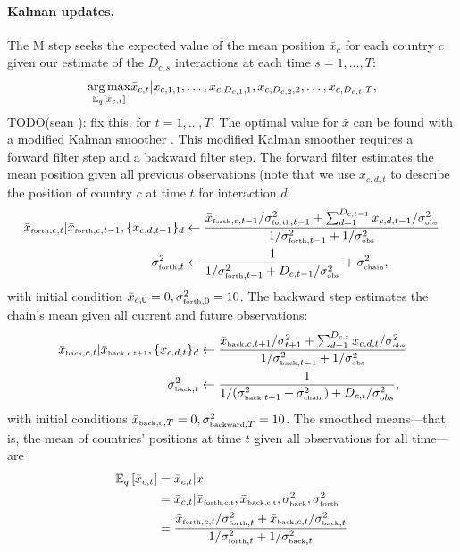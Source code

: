 \paragraph{Kalman updates.}
The M step seeks the expected value of the mean position $\bar x_c$
for each country $c$ given our estimate of the $D_{c,s}$ interactions
at each time $s=1, \ldots, T$:
\begin{align}
  \underset{ \mathbb{E}_q\left[ \bar x_{c,t} \right] }
  {\arg \max } \bar x_{c,t} | x_{c,1,1}, \ldots, x_{c,D_{c,1},1}, x_{c,D_{c,2},2},
  \ldots, x_{c,D_{c,t},T},
\end{align}
TODO(sean ): fix this.
for $t=1, \ldots, T$. The optimal value for $\bar x$ can be found with
a modified Kalman smoother \cite{kalman:1960}.  This modified Kalman
smoother requires a forward filter step and a backward filter step.
The forward filter estimates the mean position given all previous
observations (note that we use $x_{c,d,t}$ to describe the position of
country $c$ at time $t$ for interaction $d$:
\begin{align}
  \bar x_{\mbox{\tiny forth},c,t} | \bar x_{\mbox{\tiny forth},c,t-1}, \{ x_{c,d,t-1} \}_{d}
  & \gets \frac{\bar x_{\mbox{\tiny forth},c,t-1} / \sigma_{\mbox{\tiny forth},t-1}^2
    + \sum_{d=1}^{D_{c,t-1}} x_{c,d,t-1} / \sigma_{\mbox{\tiny obs}}^2}
  {1 / \sigma_{\mbox{\tiny forth},t-1}^2 + 1 / \sigma_{\mbox{\tiny obs}}^2} \\
  \sigma_{\mbox{\tiny forth},t}^2
  & \gets \frac{1}{1 / \sigma_{\mbox{\tiny forth},t - 1}^2
    + D_{c,t-1} / \sigma_{\mbox{\tiny obs}}^2} + \sigma_{\mbox{\tiny chain}}^2,
\end{align}
with initial condition $\bar x_{c,0} = 0,
\sigma_{\mbox{\tiny forth},0}^2=10$.  The backward step estimates
the chain's mean given all current and future observations:
\begin{align}
  \bar x_{\mbox{\tiny back},c,t} | \bar x_{\mbox{\tiny back,c,t+1}}, \{ x_{c,d,t} \}_d
  & \gets \frac{\bar x_{\mbox{\tiny back},c,t+1} / \sigma_{t+1}^2
    + \sum_{d=1}^{D_{c,t}} x_{c,d,t} / \sigma_{\mbox{\tiny obs}}^2}
  {1 / \sigma_{\mbox{\tiny back},t-1}^2 + 1 / \sigma_{\mbox{\tiny obs}}^2} \nonumber \\
  \sigma_{\mbox{\tiny back},t}^2
  & \gets \frac{1}{1 / (\sigma_{\mbox{\tiny back},t + 1}^2 + \sigma_{\mbox{\tiny chain}}^2)
    + D_{c,t} / \sigma_{\tiny obs}^2},
\end{align}
with initial conditions $\bar x_{\mbox{\tiny back},c,T} = 0, \sigma_{\mbox{\tiny
    backward},T}^2=10$. The smoothed means---that is, the mean of countries' positions at time $t$ given all observations for all time---are
\begin{align}
  \mathbb{E}_q\left[\bar x_{c,t}\right] & = \bar x_{c,t} | x \nonumber \\
  & = \bar x_{c,t} | \bar x_{\mbox{\tiny forth,c,t}}, \bar x_{\mbox{\tiny back,c,t}}, \sigma_{\mbox{\tiny back}}^2, \sigma_{\mbox{\tiny forth}}^2 \nonumber \\
  & = \frac{\bar x_{\mbox{\tiny forth},c,t} / \sigma_{\mbox{\tiny forth},t}^2
    + \bar x_{\mbox{\tiny back},c,t} / \sigma_{\mbox{\tiny back},t}^2}
  {1 / \sigma_{\mbox{\tiny forth},t}^2
    + 1 / \sigma_{\mbox{\tiny back},t}^2}
\end{align}

